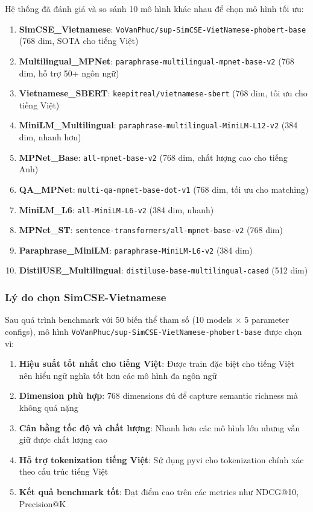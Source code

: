 Hệ thống đã đánh giá và so sánh 10 mô hình khác nhau để chọn mô hình tối ưu:

\begin{enumerate}
    \item \textbf{SimCSE\_Vietnamese}: \texttt{VoVanPhuc/sup-SimCSE-VietNamese-phobert-base} (768 dim, SOTA cho tiếng Việt)
    \item \textbf{Multilingual\_MPNet}: \texttt{paraphrase-multilingual-mpnet-base-v2} (768 dim, hỗ trợ 50+ ngôn ngữ)
    \item \textbf{Vietnamese\_SBERT}: \texttt{keepitreal/vietnamese-sbert} (768 dim, tối ưu cho tiếng Việt)
    \item \textbf{MiniLM\_Multilingual}: \texttt{paraphrase-multilingual-MiniLM-L12-v2} (384 dim, nhanh hơn)
    \item \textbf{MPNet\_Base}: \texttt{all-mpnet-base-v2} (768 dim, chất lượng cao cho tiếng Anh)
    \item \textbf{QA\_MPNet}: \texttt{multi-qa-mpnet-base-dot-v1} (768 dim, tối ưu cho matching)
    \item \textbf{MiniLM\_L6}: \texttt{all-MiniLM-L6-v2} (384 dim, nhanh)
    \item \textbf{MPNet\_ST}: \texttt{sentence-transformers/all-mpnet-base-v2} (768 dim)
    \item \textbf{Paraphrase\_MiniLM}: \texttt{paraphrase-MiniLM-L6-v2} (384 dim)
    \item \textbf{DistilUSE\_Multilingual}: \texttt{distiluse-base-multilingual-cased} (512 dim)
\end{enumerate}

\subsubsection{Lý do chọn SimCSE-Vietnamese}

Sau quá trình benchmark với 50 biến thể tham số (10 models × 5 parameter configs), mô hình \texttt{VoVanPhuc/sup-SimCSE-VietNamese-phobert-base} được chọn vì:

\begin{enumerate}
    \item \textbf{Hiệu suất tốt nhất cho tiếng Việt}: Được train đặc biệt cho tiếng Việt nên hiểu ngữ nghĩa tốt hơn các mô hình đa ngôn ngữ
    \item \textbf{Dimension phù hợp}: 768 dimensions đủ để capture semantic richness mà không quá nặng
    \item \textbf{Cân bằng tốc độ và chất lượng}: Nhanh hơn các mô hình lớn nhưng vẫn giữ được chất lượng cao
    \item \textbf{Hỗ trợ tokenization tiếng Việt}: Sử dụng pyvi cho tokenization chính xác theo cấu trúc tiếng Việt
    \item \textbf{Kết quả benchmark tốt}: Đạt điểm cao trên các metrics như NDCG@10, Precision@K
\end{enumerate}

